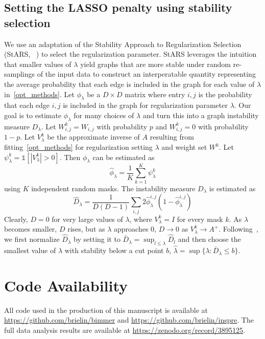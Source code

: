 \documentclass{article}
\begin{document}
\subsection{Setting the LASSO penalty using stability selection}
We use an adaptation of the Stability Approach to Regularization Selection (StARS, ~\cite{Liu2010})
to select the regularization parameter. StARS leverages the intuition that smaller values
of $\lambda$ yield graphs that are more stable under random re-samplings of the input data
to construct an interperatable quantity representing the average probability
that each edge is included in the graph for each value of $\lambda$ in~\eqref{opt_methods}.
Let $\phi_{\lambda}$ be a $D\times D$ matrix where entry $i, j$ is the probability that each edge
$i,j$ is included in the graph for regularization parameter $\lambda$. Our goal is to
estimate $\phi_{\lambda}$ for many choices of $\lambda$ and
turn this into a graph instability measure $D_\lambda$.
Let $W^k_{i,j} = W_{i,j}$ with probability $p$ and $W^k_{i,j} = 0$ with
probability $1-p$. Let $V_{\lambda}^k$ be the approximate inverse of
$A$ resulting from fitting~\eqref{opt_methods} for regularization setting
$\lambda$ and weight set $W^k$. Let $\psi^k_{\lambda} = \mathds{1}[|V^k_{\lambda}| > 0]$.
Then  $\phi_{\lambda}$ can be estimated as
\begin{equation}
\hat{\phi}_{\lambda} = \frac{1}{K} \sum_{k=1}^K \psi^{k}_{\lambda}
\end{equation}
using $K$ independent random masks.
The instability measure $D_\lambda$ is estimated as~\cite{Liu2010}
\begin{equation}
\hat{D}_\lambda = \frac{1}{D(D-1)} \sum_{i, j} 2 \hat{\phi}^{i, j}_\lambda(1-\hat{\phi}^{i, j}_\lambda)
\end{equation}
Clearly, $D = 0$ for very large values of $\lambda$, where $V^k_\lambda = I$
for every mask $k$. As $\lambda$ becomes smaller, $D$ rises, but as $\lambda$ approaches $0$,
$D\rightarrow 0$ as $V^k_\lambda \rightarrow A^+$. Following~\cite{Liu2010},
we first normalize $\hat{D}_\lambda$ by setting it to
$\bar{D}_\lambda = \sup_{l \leq \lambda} \hat{D}_l$ and then choose the smallest
value of $\lambda$ with stability below a cut point $b$,
$\hat{\lambda} = \sup \{ \lambda : \bar{D}_\lambda \leq b \}$.

\section{Code Availability}
All code used in the production of this manuscript is available at \url{https://github.com/brielin/bimmer}
and \url{https://github.com/brielin/inspre}. The full data analysis results are available
at \url{https://zenodo.org/record/3895125}.
\end{document}
